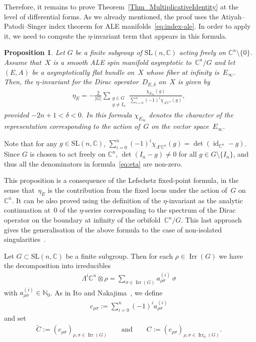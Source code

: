 \documentclass[10pt,a4paper]{amsart}
\numberwithin{equation}{section}
\newcommand{\N}{{\mathbb N}}
\newcommand{\C}{{\mathbb C}}
\newcommand{\SL}{\mathrm{SL}}
\newcommand{\Irr}{\operatorname{Irr}}
\newcommand{\id}{\operatorname{id}}
\newtheorem{Proposition}[Theorem]{Proposition}
 { \theoremstyle{definition}
\newtheorem{Definition}[Theorem]{Definition}
\newtheorem{Remark}[Theorem]{Remark} }
\begin{document}
Therefore, it remains to prove Theorem~\ref{Thm_MultiplicativeIdentity} at the level of
dif\/ferential forms.  As we already mentioned, the proof uses the
Atiyah--Patodi--Singer index theorem for ALE
manifolds~\eqref{eq:index-ale}. In order to apply it, we need to
compute the $\eta$-invariant term that appears in this formula.

\begin{Proposition}
  Let $G$ be a finite subgroup of $\SL(n,\C)$ acting freely on $\C^n
  {\setminus} \{0\}$. Assume that~$X$ is a smooth ALE spin manifold
  asymptotic to~$\C^n/G$ and let~$(E,A)$ be a asymptotically flat
  bundle on~$X$ whose fiber at infinity is~$E_{\infty}$. Then, the
  $\eta$-invariant for the Dirac operator~$D_{E,\delta}$ on~$X$ is
  given by
  \begin{gather}\label{eq:eta}
    \eta_E = -\frac{2}{|G|} \sum_{\substack{g \in G \\ g \neq I_n}}
    \frac{\chi_{E_{\infty}} (g)}{\sum\limits_{i=0}^n (-1)^i \chi_{\Lambda^i\C^n}(g)},
  \end{gather}
  provided $-2n+1<\delta <0$.  In this formula $\chi_{E_{\infty}}$ denotes the
  character of the representation corresponding to the action of~$G$
  on the vector space~$E_{\infty}$.
\end{Proposition}

\begin{Remark}
  Note that for any $g\in \SL(n,\C)$, $\sum\limits_{i=0}^n (-1)^i
  \chi_{\Lambda^i\C^n} (g) = \det(\id_{\C^n}-g)$. Since $G$ is chosen to act
  freely on $\C^n$, $\det(I_n-g) \neq 0$ for all $g \in G{\setminus}
  \{I_n\}$, and thus all the denominators in formula~\eqref{eq:eta} are
  non-zero.
\end{Remark}

This proposition is a consequence of the Lefschetz f\/ixed-point
formula, in the sense that~$\eta_E$ is the contribution from the f\/ixed
locus under the action of~$G$ on~$\C^n$. It can be also proved using
the def\/inition of the $\eta$-invariant as the analytic continuation at~$0$ of the $\eta$-series correspon\-ding to the spectrum of the Dirac
operator on the boundary at inf\/inity of the orbi\-fold~$\C^n/G$.  This
last approach gives the generalisation of the above formula to the
case of non-isolated singularities~\cite{Degeratu2001}.

Let $G\subset\SL(n,\C)$ be a f\/inite subgroup.  Then for each $\rho\in
\Irr(G)$ we have the decomposition into irreducibles
\begin{gather}\label{eq:vr}
  \Lambda^i\C^n \otimes \rho
    = \sum_{\sigma \in \Irr(G)} a^{(i)}_{\rho\sigma}\ \sigma
\end{gather}
with $a^{(i)}_{\rho\sigma}\in\N_0$.  As in Ito and
Nakajima~\cite{Ito2000}, we def\/ine
\begin{gather}\label{eq:cartan}
  c_{\rho\sigma} := \sum_{i=0}^n (-1)^i a_{\rho\sigma}^{(i)}
\end{gather}
and set
\begin{gather}
  \label{Eq_C}
  \tilde C:=(c_{\rho\sigma})_{\rho,\sigma \in \Irr(G)} \qquad\text{and}\qquad
  C:=(c_{\rho\sigma})_{\rho,\sigma \in \Irr_0(G)}.
\end{gather}
\end{document}
